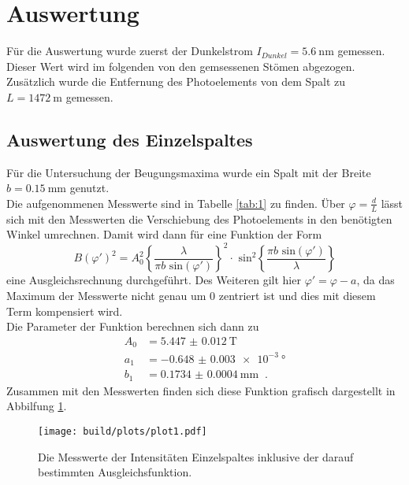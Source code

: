 \section{Auswertung}

\noindent Für die Auswertung wurde zuerst der Dunkelstrom $I_{Dunkel}=\SI{5.6}{\nano\metre}$ gemessen. Dieser Wert wird im folgenden von den gemsessenen Stömen abgezogen.\\
Zusätzlich wurde die Entfernung des Photoelements von dem Spalt zu $L=\SI{1472}{\metre}$ gemessen.

\subsection{Auswertung des Einzelspaltes}

\noindent Für die Untersuchung der Beugungsmaxima wurde ein Spalt mit der Breite $b=\SI{0.15}{\milli\metre}$ genutzt.\\
Die aufgenommenen Messwerte sind in Tabelle \ref{tab:1} zu finden. Über $\varphi=\frac{d}{L}$ lässt sich mit den Messwerten die Verschiebung des Photoelements in den benötigten Winkel umrechnen.
Damit wird dann für eine Funktion der Form
\begin{equation}
    B(\varphi')^2 = A_0^2 \left\{ \frac{\lambda}{\pi b \text{ sin}(\varphi')} \right\}^2 \cdot \text{ sin}^2 
    \left\{\frac{\pi b \text{ sin}(\varphi')}{\lambda} \right\}
    \label{eqn:einzel}
\end{equation}
\noindent eine Ausgleichsrechnung durchgeführt. Des Weiteren gilt hier $\varphi'=\varphi-a$, da das Maximum der Messwerte nicht genau um $0$ zentriert ist und dies mit diesem Term kompensiert wird.\\
Die Parameter der Funktion berechnen sich dann zu
\begin{align*}
    A_0&=\SI{5.447(0012)}{\tesla}\\
    a_1&=\SI{-0.648(0003)e-3}{\degree}\\
    b_1&=\SI{0.1734(00004)}{\milli\metre}\; \; .
\end{align*}
\noindent Zusammen mit den Messwerten finden sich diese Funktion grafisch dargestellt in Abbilfung \ref{fig:plot1}.
\begin{figure}[ht]
    \centering
    \texttt{[image: build/plots/plot1.pdf]}
    \caption{Die Messwerte der Intensitäten Einzelspaltes inklusive der darauf bestimmten Ausgleichsfunktion.}
    \label{fig:plot1}
  \end{figure}

